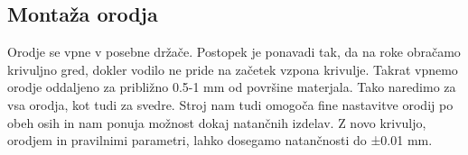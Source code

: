 \subsection{Montaža orodja}
Orodje se vpne v posebne držače. Postopek je ponavadi tak, da na roke obračamo krivuljno gred, dokler vodilo ne pride na začetek vzpona krivulje. Takrat vpnemo orodje oddaljeno za približno 0.5-1 mm od površine materjala. Tako naredimo za vsa orodja, kot tudi za svedre. 
Stroj nam tudi omogoča fine nastavitve orodij po obeh osih in nam ponuja možnost dokaj natančnih izdelav. Z novo krivuljo, orodjem in pravilnimi parametri, lahko dosegamo natančnosti do ±0.01 mm.

\newpage